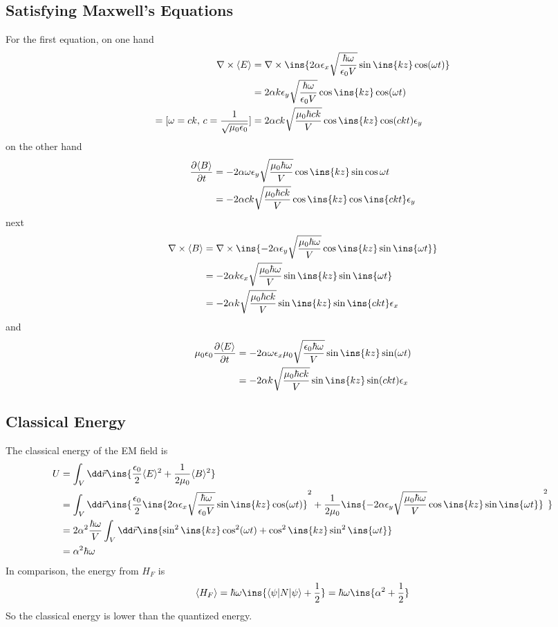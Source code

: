 \subsection{Satisfying Maxwell's Equations}
For the first equation, on one hand
\begin{align}
	\nabla\times \langle E\rangle &= \nabla\times \ins{2\alpha\epsilon_x\sqrt{\frac{\hbar\omega}{\epsilon_0V}}\sin\ins{kz}\cos(\omega t)}\\
	&= 2\alpha k\epsilon_y\sqrt{\frac{\hbar\omega}{\epsilon_0V}}\cos\ins{kz}\cos(\omega t)\\
	=[\omega=ck,\,c=\frac{1}{\sqrt{\mu_0\epsilon_0}}] &= 2\alpha ck\sqrt{\frac{\mu_0\hbar ck}{V}}\cos\ins{kz}\cos(ckt)\epsilon_y
\end{align}
on the other hand
\begin{align}
	\diffp{\langle B\rangle}{t} &= -2\alpha\omega\epsilon_y\sqrt{\frac{\mu_0\hbar\omega}{V}}\cos\ins{kz}\sin\cos{\omega t}\\
	&= -2\alpha ck\sqrt{\frac{\mu_0\hbar ck}{V}}\cos\ins{kz}\cos\ins{ckt}\epsilon_y
\end{align}
next
\begin{align}
	\nabla\times\langle B \rangle &= \nabla\times\ins{-2\alpha\epsilon_y\sqrt{\frac{\mu_0\hbar\omega}{V}}\cos\ins{kz}\sin\ins{\omega t}}\\
	&= -2\alpha k\epsilon_x\sqrt{\frac{\mu_0\hbar\omega}{V}}\sin\ins{kz}\sin\ins{\omega t}\\
	&= -2\alpha k\sqrt{\frac{\mu_0\hbar ck}{V}}\sin\ins{kz}\sin\ins{ckt}\epsilon_x
\end{align}
and
\begin{align}
	\mu_0\epsilon_0\diffp{\langle E \rangle}{t} &= -2\alpha\omega\epsilon_x\mu_0\sqrt{\frac{\epsilon_0\hbar\omega}{V}}\sin\ins{kz}\sin(\omega t)\\
	&= -2\alpha k\sqrt{\frac{\mu_0\hbar ck}{V}}\sin\ins{kz}\sin(ckt)\epsilon_x
\end{align}
\newpage
\subsection{Classical Energy}
The classical energy of the EM field is
\begin{align}
	U &= \int_V\dd \vec r \ins{\frac{\epsilon_0}{2}\langle E\rangle^2+\frac{1}{2\mu_0}\langle B\rangle^2}\\
	&= \int_V\dd \vec r \ins{\frac{\epsilon_0}{2}\ins{2\alpha\epsilon_x\sqrt{\frac{\hbar\omega}{\epsilon_0V}}\sin\ins{kz}\cos(\omega t)}^2+\frac{1}{2\mu_0}\ins{-2\alpha\epsilon_y\sqrt{\frac{\mu_0\hbar\omega}{V}}\cos\ins{kz}\sin\ins{\omega t}}^2}\\
	&= 2\alpha^2\frac{\hbar\omega}{V}\int_V\dd \vec r \ins{\sin^2\ins{kz}\cos^2(\omega t)+\cos^2\ins{kz}\sin^2\ins{\omega t}}\\
	&= \alpha^2\hbar\omega
\end{align}
In comparison, the energy from $H_F$ is
\begin{equation}
	\langle H_F\rangle = \hbar\omega \ins{\braket{\psi\vert N \vert\psi}+\frac{1}{2}} = \hbar\omega\ins{\alpha^2+\frac{1}{2}}
\end{equation}
So the classical energy is lower than the quantized energy.

